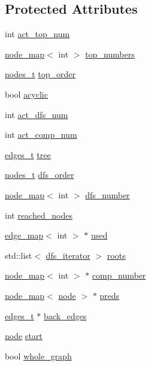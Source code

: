 \subsection*{Protected Attributes}
\begin{DoxyCompactItemize}
\item 
int \mbox{\hyperlink{classtopsort_ae04dea9ee7f97be6e0e9673afb601f96}{act\+\_\+top\+\_\+num}}
\item 
\mbox{\hyperlink{classnode__map}{node\+\_\+map}}$<$ int $>$ \mbox{\hyperlink{classtopsort_ae57da1aae22ed92acd0d84c737a1da2b}{top\+\_\+numbers}}
\item 
\mbox{\hyperlink{edge_8h_a22ac17689106ba21a84e7bc54d1199d6}{nodes\+\_\+t}} \mbox{\hyperlink{classtopsort_a8b18b1b7ce816683694d6ac567e55cb8}{top\+\_\+order}}
\item 
bool \mbox{\hyperlink{classtopsort_a01d94e7627a5660836cc0765ec15727a}{acyclic}}
\item 
int \mbox{\hyperlink{classdfs_aedaf2b485ff83150b1de6c305922473b}{act\+\_\+dfs\+\_\+num}}
\item 
int \mbox{\hyperlink{classdfs_ab0251ac30adfd569e214a64db7f3a905}{act\+\_\+comp\+\_\+num}}
\item 
\mbox{\hyperlink{edge_8h_a8f9587479bda6cf612c103494b3858e3}{edges\+\_\+t}} \mbox{\hyperlink{classdfs_aed496b618a937723bfec0b463e17e8d5}{tree}}
\item 
\mbox{\hyperlink{edge_8h_a22ac17689106ba21a84e7bc54d1199d6}{nodes\+\_\+t}} \mbox{\hyperlink{classdfs_af70a73ace68afd91ef944f984c9f28d5}{dfs\+\_\+order}}
\item 
\mbox{\hyperlink{classnode__map}{node\+\_\+map}}$<$ int $>$ \mbox{\hyperlink{classdfs_a99727f2274d6af63daae4f0518f3adbe}{dfs\+\_\+number}}
\item 
int \mbox{\hyperlink{classdfs_acb11186a1a2a2a1f38cdc0674340ba37}{reached\+\_\+nodes}}
\item 
\mbox{\hyperlink{classedge__map}{edge\+\_\+map}}$<$ int $>$ $\ast$ \mbox{\hyperlink{classdfs_afc18288747491be301d6d8d85d8f220b}{used}}
\item 
std\+::list$<$ \mbox{\hyperlink{classdfs_a15fe023a5a1f7ddda00f3d87110d9a32}{dfs\+\_\+iterator}} $>$ \mbox{\hyperlink{classdfs_a0bbd5cb8df26c891b74dadd84b46a06b}{roots}}
\item 
\mbox{\hyperlink{classnode__map}{node\+\_\+map}}$<$ int $>$ $\ast$ \mbox{\hyperlink{classdfs_a00db016ac7eab69045cae408008890c1}{comp\+\_\+number}}
\item 
\mbox{\hyperlink{classnode__map}{node\+\_\+map}}$<$ \mbox{\hyperlink{classnode}{node}} $>$ $\ast$ \mbox{\hyperlink{classdfs_a3fdeb5a211a1bc1753b2a637258c5355}{preds}}
\item 
\mbox{\hyperlink{edge_8h_a8f9587479bda6cf612c103494b3858e3}{edges\+\_\+t}} $\ast$ \mbox{\hyperlink{classdfs_a1dc18a7df8d6b238d5301c92fc7540fa}{back\+\_\+edges}}
\item 
\mbox{\hyperlink{classnode}{node}} \mbox{\hyperlink{classdfs_af677cfc31fe06a18dd3a3aae7f7d112b}{start}}
\item 
bool \mbox{\hyperlink{classdfs_ab8342c80ab208ef0e0d781f0769d0d95}{whole\+\_\+graph}}
\end{DoxyCompactItemize}


